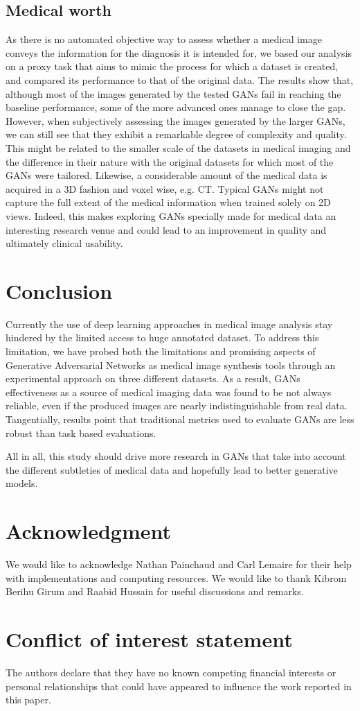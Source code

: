 \documentclass[preprint,12pt, authoryear]{elsarticle}
\begin{document}
\subsection{Medical worth}
As there is no automated objective way to assess whether a medical image conveys the information for the diagnosis it is intended for, we based our analysis on a proxy task that aims to mimic the process for which a dataset is created, and compared its performance to that of the original data. The results show that, although most of the images generated by the tested GANs fail in reaching the baseline performance, some of the more advanced ones manage to close the gap. However, when subjectively assessing the images generated by the larger GANs, we can still see that they exhibit a remarkable degree of complexity and quality. This might be related to the smaller scale of the datasets in medical imaging and the difference in their nature with the original datasets for which most of the GANs were tailored. Likewise, a considerable amount of the medical data is acquired in a 3D fashion and voxel wise, e.g. CT. Typical GANs might not capture the full extent of the medical information when trained solely on 2D views.
Indeed, this makes exploring GANs specially made for medical data an interesting research venue and could lead to an improvement in quality and ultimately clinical usability.

\section{Conclusion}
\label{sec:conclusion}
Currently the use of deep learning approaches in medical image analysis stay hindered by the limited access to huge annotated dataset. To address this limitation, we have probed both the limitations and promising aspects of Generative Adversarial Networks as medical image synthesis tools through an experimental approach on three different datasets. As a result, GANs effectiveness as a source of medical imaging data was found to be not always reliable, even if the produced images are nearly indistinguishable from real data. Tangentially, results point that traditional metrics used to evaluate GANs are less robust than task based evaluations.

All in all, this study should drive more research in GANs that take into account the different subtleties of medical data and hopefully lead to better generative models.

\section*{Acknowledgment}
We would like to acknowledge Nathan Painchaud and Carl Lemaire for their help with implementations and computing resources. We would like to thank Kibrom Berihu Girum and Raabid Hussain for useful discussions and remarks.

\section*{Conflict of interest statement}
The authors declare that they have no known competing financial interests or personal relationships that could have appeared to influence the work reported in this paper.




\footnotesize
  
 
\end{document}
